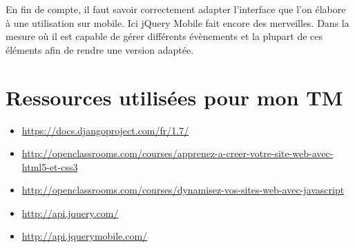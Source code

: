 \documentclass[a4paper,11pt,oneside]{sphinxmanual}
\begin{document}
En fin de compte, il faut savoir correctement adapter l'interface que l'on élabore
à une utilisation sur mobile. Ici jQuery Mobile fait encore des merveilles. Dans
la mesure où il est capable de gérer différents évènements et la plupart de ces
éléments afin de rendre une version adaptée.


\chapter{Ressources utilisées pour mon TM}
\label{ressources::doc}\label{ressources:ressources-utilisees-pour-mon-tm}\begin{itemize}
\item {} 
\href{https://docs.djangoproject.com/fr/1.7/}{https://docs.djangoproject.com/fr/1.7/}

\item {} 
\href{http://openclassrooms.com/courses/apprenez-a-creer-votre-site-web-avec-html5-et-css3}{http://openclassrooms.com/courses/apprenez-a-creer-votre-site-web-avec-html5-et-css3}

\item {} 
\href{http://openclassrooms.com/courses/dynamisez-vos-sites-web-avec-javascript}{http://openclassrooms.com/courses/dynamisez-vos-sites-web-avec-javascript}

\item {} 
\href{http://api.jquery.com/}{http://api.jquery.com/}

\item {} 
\href{http://api.jquerymobile.com/}{http://api.jquerymobile.com/}

\end{itemize}



\renewcommand{\indexname}{Index}
\printindex
\end{document}
